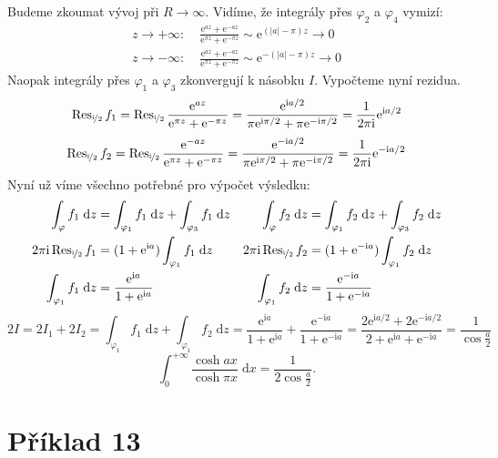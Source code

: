 \documentclass[10pt,a4paper]{article}
\newcommand{\const}[1]{\text{#1}}
\newcommand{\Res}{\operatorname{Res}}
\renewcommand{\d}[1]{\;\const{d}#1}
\newcommand{\e}[1]{\const{e}^{#1}}
\renewcommand{\i}{\const{i}}
\begin{document}
Budeme zkoumat vývoj při $R \to \infty$. Vidíme, že integrály přes $\varphi_2$ a $\varphi_4$ vymizí:
\begin{align*}
    z \to +\infty: \; &\frac{\e{az} + \e{-az}}{\e{\pi z} + \e{-\pi z}}
    \sim \e{(|a|-\pi)z} \to 0
    \\
    z \to -\infty: \; &\frac{\e{az} + \e{-az}}{\e{\pi z} + \e{-\pi z}}
    \sim \e{-(|a|-\pi)z} \to 0
\end{align*}
Naopak integrály přes $\varphi_1$ a $\varphi_3$ zkonvergují k násobku $I$. Vypočteme nyní rezidua.
\begin{equation*}
    \Res_{\nicefrac{\i}{2}} f_1
    = \Res_{\nicefrac{\i}{2}} \frac{\e{az}}{\e{\pi z} + \e{-\pi z}}
    = \frac{\e{\i a/2}}{\pi\e{\i\pi/2} + \pi\e{-\i\pi/2}}
    = \frac{1}{2\pi\i} \e{\i a/2}
\end{equation*}
\begin{equation*}
    \Res_{\nicefrac{\i}{2}} f_2
    = \Res_{\nicefrac{\i}{2}} \frac{\e{-az}}{\e{\pi z} + \e{-\pi z}}
    = \frac{\e{-\i a/2}}{\pi\e{\i\pi/2} + \pi\e{-\i\pi/2}}
    = \frac{1}{2\pi\i} \e{-\i a/2}
\end{equation*}
Nyní už víme všechno potřebné pro výpočet výsledku:
\begin{align*}
    \int_\varphi f_1 \d{z}
    &= \int_{\varphi_1} f_1 \d{z} + \int_{\varphi_3} f_1 \d{z}
    &
    \int_\varphi f_2 \d{z}
    &= \int_{\varphi_1} f_2 \d{z} + \int_{\varphi_3} f_2 \d{z}
    \\
    2\pi\i \Res_{\nicefrac{\i}{2}} f_1
    &= (1+\e{\i a}) \int_{\varphi_1} f_1 \d{z}
    &
    2\pi\i \Res_{\nicefrac{\i}{2}} f_2
    &= (1+\e{-\i a}) \int_{\varphi_1} f_2 \d{z}
    \\
    \int_{\varphi_1} f_1 \d{z}
    &= \frac{\e{\i a}}{1+\e{\i a}}
    &
    \int_{\varphi_1} f_2 \d{z}
    &= \frac{\e{-\i a}}{1+\e{-\i a}}
\end{align*}
\begin{equation*}
    2I = 2I_1 + 2I_2
    = \int_{\varphi_1} f_1 \d{z} + \int_{\varphi_1} f_2 \d{z}
    = \frac{\e{\i a}}{1+\e{\i a}} + \frac{\e{-\i a}}{1+\e{-\i a}}
    = \frac{2\e{\i a/2} + 2\e{-\i a/2}}{2 + \e{\i a} + \e{-\i a}}
    = \frac{1}{\cos \frac{a}{2}}
\end{equation*}
\bigskip
\begin{equation*}
    \int_0^{+\infty}\frac{\cosh ax}{\cosh \pi x} \d{x} = \frac{1}{2 \cos \frac{a}{2}}.
\end{equation*}

\pagebreak

\section{Příklad 13}
\end{document}
